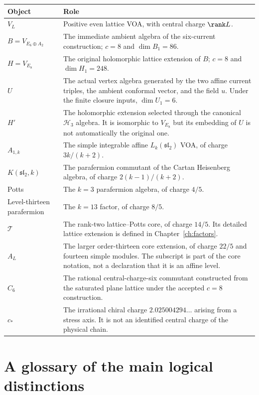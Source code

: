 \begin{longtable}{p{}p{}}
\toprule Object&Role\\\midrule
\endhead
$V_L$&Positive even lattice VOA, with central charge
$\rank L$.\\
$B=V_{E_6\oplus A_2}$&The immediate ambient algebra of the
six-current construction; $c=8$ and $\dim B_1=86$.\\
$H=V_{E_8}$&The original holomorphic lattice extension of
$B$; $c=8$ and $\dim H_1=248$.\\
$U$&The actual vertex algebra generated by the two affine
current triples, the ambient conformal vector, and the field
$u$. Under the finite closure inputs, $\dim U_1=6$.\\
$H'$&The holomorphic extension selected through the canonical
$\mathcal H_3$ algebra. It is isomorphic to $V_{E_8}$ but its
embedding of $U$ is not automatically the original one.\\
$A_{1,k}$&The simple integrable affine
$L_k(\mathfrak{sl}_2)$ VOA, of charge $3k/(k+2)$.\\
$K(\mathfrak{sl}_2,k)$&The parafermion commutant of the
Cartan Heisenberg algebra, of charge $2(k-1)/(k+2)$.\\
Potts&The $k=3$ parafermion algebra, of charge $4/5$.\\
Level-thirteen parafermion&The $k=13$ factor, of charge $8/5$.\\
$\mathcal T$&The rank-two lattice--Potts core, of charge
$14/5$. Its detailed lattice extension is defined in
Chapter~\ref{ch:factors}.\\
$A_L$&The larger order-thirteen core extension, of charge
$22/5$ and fourteen simple modules. The subscript is part of
the core notation, not a declaration that it is an affine
level.\\
$C_6$&The rational central-charge-six commutant constructed
from the saturated plane lattice under the accepted $c=8$
construction.\\
$c_*$&The irrational chiral charge
$2.025004294\ldots$ arising from a stress axis. It is not an
identified central charge of the physical chain.\\
\bottomrule
\end{longtable}

\section{A glossary of the main logical distinctions}

